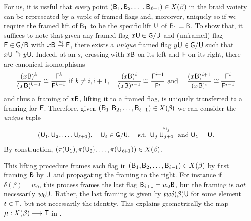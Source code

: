 For us, it is useful that {\it every} point $(\mathsf{B}_1,\mathsf{B}_2,\ldots,\mathsf{B}_{\ell+1})\in X(\beta)$ in the braid variety can be represented by a tuple of framed flags and, moreover, uniquely so if we require the framed lift of $\mathsf{B}_1$ to be the specific lift $\mathsf{U}$ of $\mathsf{B}_1=\mathsf{B}$. To show that, it suffices to note that given any framed flag $x\mathsf{U}\in\mathsf{G}/\mathsf{U}$ and (unframed) flag $\mathsf{F}\in\mathsf{G}/\mathsf{B}$ with $x\mathsf{B}\stackrel{s_i}{\to}\mathsf{F}$, there exists a {\it unique} framed flag $y\mathsf{U}\in\mathsf{G}/\mathsf{U}$ such that $x\mathsf{U}\stackrel{s_i}{\to}y\mathsf{U}$. Indeed, at an $s_i$-crossing with $x\mathsf{B}$ on its left and $\mathsf{F}$ on its right, there are canonical isomorphisms
$$\frac{(x\mathsf{B})^k}{(x\mathsf{B})^{k-1}}\cong \frac{\mathsf{F}^k}{\mathsf{F}^{k-1}}\mbox{ if }k\neq i,i+1,\quad \frac{(x\mathsf{B})^i}{(x\mathsf{B})^{i-1}}\cong \frac{\mathsf{F}^{i+1}}{\mathsf{F}^{i}}\mbox{ and }\quad \frac{(x\mathsf{B})^{i+1}}{(x\mathsf{B})^{i}}\cong \frac{\mathsf{F}^{i}}{\mathsf{F}^{i-1}}$$
and thus a framing of $x\mathsf{B}$, lifting it to a framed flag, is uniquely transferred to a framing for $\mathsf{F}$. Therefore, given $(\mathsf{B}_1,\mathsf{B}_2,\ldots,\mathsf{B}_{\ell+1})\in X(\beta)$ we can consider the {\it unique} tuple
$$(\mathsf{U}_1,\mathsf{U}_2,\ldots,\mathsf{U}_{\ell+1}),\quad \mathsf{U}_i\in\mathsf{G}/\mathsf{U},\quad \mbox{s.t. }\mathsf{U}_j\stackrel{s_{i_j}}{\mathsf{U}_{j+1}}\mbox{ and }\mathsf{U}_1=\mathsf{U}.$$
\noindent By construction, $(\pi(\mathsf{U}_1),\pi(\mathsf{U}_2),\ldots,\pi(\mathsf{U}_{\ell+1}))\in X(\beta)$.

\begin{remark}\label{rmk:unipotent_representative_lastflag}
This lifting procedure frames each flag in $(\mathsf{B}_1,\mathsf{B}_2,\ldots,\mathsf{B}_{\ell+1})\in X(\beta)$ by first framing $\mathsf{B}$ by $\mathsf{U}$ and propagating the framing to the right. For instance if $\delta(\beta)=w_0$, this process frames the last flag $\mathsf{B}_{\ell+1}=w_0\mathsf{B}$, but the framing is {\it not} necessarily $w_0\mathsf{U}$. Rather, the last framing is given by $tw\delta(\beta)\mathsf{U}$ for some element $t\in\mathsf{T}$, but not necessarily the identity. This explains geometrically the map $\mu:X(\beta)\longrightarrow\mathsf{T}$ in .\sbs
\end{remark}

